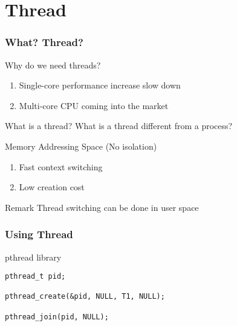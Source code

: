 \section{Thread}

\begin{frame}
    \frametitle{What? Thread?}
    Why do we need threads?
    \begin{enumerate}
        \item Single-core performance increase slow down
        \item Multi-core CPU coming into the market
    \end{enumerate}

    What is a thread? What is a thread different from a process?

    Memory Addressing Space (No isolation)
    \begin{enumerate}
        \item Fast context switching
        \item Low creation cost
    \end{enumerate}

    \vspace{2em}

    \begin{alertblock}{Remark}
        Thread switching can be done in user space
    \end{alertblock}
\end{frame}


\begin{frame}[fragile]
    \frametitle{Using Thread}
    pthread library

    \vspace{2em}

    \begin{lstlisting}
pthread_t pid;

pthread_create(&pid, NULL, T1, NULL);

pthread_join(pid, NULL);
    \end{lstlisting}
\end{frame}

